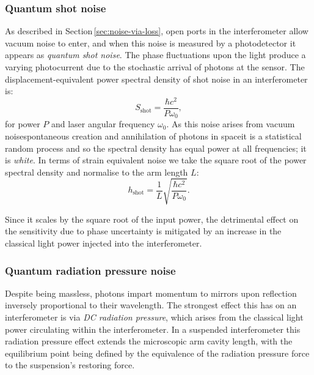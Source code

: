\subsubsection{\label{sec:quantum-shot-noise}Quantum shot noise}
As described in Section\,\ref{sec:noise-via-loss}, open ports in the interferometer allow vacuum noise to enter, and when this noise is measured by a photodetector it appears as \emph{quantum shot noise}. The phase fluctuations upon the light produce a varying photocurrent due to the stochastic arrival of photons at the sensor. The displacement-equivalent power spectral density of shot noise in an interferometer is:
\begin{equation}
  \label{eq:shot-noise-psd}
  S_{\text{shot}} = \frac{\hbar c^2}{P \omega_0},
\end{equation}
for power $P$ and laser angular frequency $\omega_0$. As this noise arises from vacuum noise\textemdash spontaneous creation and annihilation of photons in space\textemdash it is a statistical random process and so the spectral density has equal power at all frequencies; it is \emph{white}. In terms of strain equivalent noise we take the square root of the power spectral density and normalise to the arm length $L$:
\begin{equation}
  h_{\text{shot}} = \frac{1}{L} \sqrt{\frac{\hbar c^2}{P \omega_0}}.
\end{equation}

Since it scales by the square root of the input power, the detrimental effect on the sensitivity due to phase uncertainty is mitigated by an increase in the classical light power injected into the interferometer.

\subsubsection{\label{sec:quantum-rp-noise}Quantum radiation pressure noise}
Despite being massless, photons impart momentum to mirrors upon reflection inversely proportional to their wavelength. The strongest effect this has on an interferometer is via \emph{\gls{DC} radiation pressure}, which arises from the classical light power circulating within the interferometer. In a suspended interferometer this radiation pressure effect extends the microscopic arm cavity length, with the equilibrium point being defined by the equivalence of the radiation pressure force to the suspension's restoring force.

